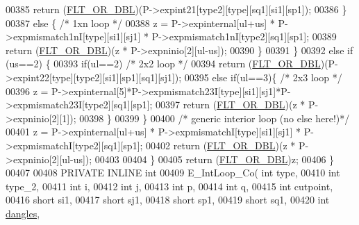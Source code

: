 \begin{DoxyCode}
00385           \textcolor{keywordflow}{return} (\hyperlink{group__data__structures_ga31125aeace516926bf7f251f759b6126}{FLT\_OR\_DBL})(P->expint21[type2][type][sq1][si1][sp1]);
00386       \}
00387       \textcolor{keywordflow}{else} \{  \textcolor{comment}{/* 1xn loop */}
00388         z = P->expinternal[ul+us] * P->expmismatch1nI[type][si1][sj1] * P->expmismatch1nI[type2][sq1][sp1];
00389         \textcolor{keywordflow}{return} (\hyperlink{group__data__structures_ga31125aeace516926bf7f251f759b6126}{FLT\_OR\_DBL})(z * P->expninio[2][ul-us]);
00390       \}
00391     \}
00392     \textcolor{keywordflow}{else} \textcolor{keywordflow}{if} (us==2) \{
00393       \textcolor{keywordflow}{if}(ul==2) \textcolor{comment}{/* 2x2 loop */}
00394         \textcolor{keywordflow}{return} (\hyperlink{group__data__structures_ga31125aeace516926bf7f251f759b6126}{FLT\_OR\_DBL})(P->expint22[type][type2][si1][sp1][sq1][sj1]);
00395       \textcolor{keywordflow}{else} \textcolor{keywordflow}{if}(ul==3)\{              \textcolor{comment}{/* 2x3 loop */}
00396         z = P->expinternal[5]*P->expmismatch23I[type][si1][sj1]*P->expmismatch23I[type2][sq1][sp1];
00397         \textcolor{keywordflow}{return} (\hyperlink{group__data__structures_ga31125aeace516926bf7f251f759b6126}{FLT\_OR\_DBL})(z * P->expninio[2][1]);
00398       \}
00399     \}
00400     \textcolor{comment}{/* generic interior loop (no else here!)*/}
00401     z = P->expinternal[ul+us] * P->expmismatchI[type][si1][sj1] * P->expmismatchI[type2][sq1][sp1];
00402     \textcolor{keywordflow}{return} (\hyperlink{group__data__structures_ga31125aeace516926bf7f251f759b6126}{FLT\_OR\_DBL})(z * P->expninio[2][ul-us]);
00403 
00404   \}
00405   \textcolor{keywordflow}{return} (\hyperlink{group__data__structures_ga31125aeace516926bf7f251f759b6126}{FLT\_OR\_DBL})z;
00406 \}
00407 
00408 PRIVATE INLINE \textcolor{keywordtype}{int}
00409 E\_IntLoop\_Co( \textcolor{keywordtype}{int} type,
00410               \textcolor{keywordtype}{int} type\_2,
00411               \textcolor{keywordtype}{int} i,
00412               \textcolor{keywordtype}{int} j,
00413               \textcolor{keywordtype}{int} p,
00414               \textcolor{keywordtype}{int} q,
00415               \textcolor{keywordtype}{int} cutpoint,
00416               \textcolor{keywordtype}{short} si1,
00417               \textcolor{keywordtype}{short} sj1,
00418               \textcolor{keywordtype}{short} sp1,
00419               \textcolor{keywordtype}{short} sq1,
00420               \textcolor{keywordtype}{int} \hyperlink{group__model__details_ga72b511ed1201f7e23ec437e468790d74}{dangles},

\end{DoxyCode}
